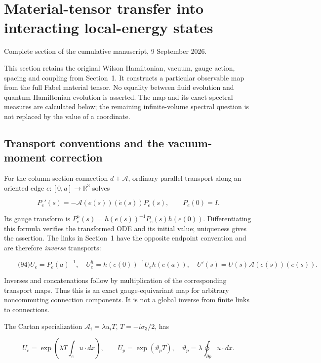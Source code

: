 \section{Material-tensor transfer into interacting local-energy
states}\label{fabel-tensor-transfer-md-material-tensor-transfer-into-interacting-local-energy-states}

Complete section of the cumulative manuscript, 9 September 2026.

This section retains the original Wilson Hamiltonian, vacuum, gauge
action, spacing and coupling from Section~1. It constructs a particular
observable map from the full Fabel material tensor. No equality between
fluid evolution and quantum Hamiltonian evolution is asserted. The map
and its exact spectral measures are calculated below; the remaining
infinite-volume spectral question is not replaced by the value of a
coordinate.

\subsection{Transport conventions and the vacuum-moment
correction}\label{fabel-tensor-transfer-md-transport-conventions-and-the-vacuum-moment-correction}

For the column-section connection \(d+\mathcal A\), ordinary parallel
transport along an oriented edge \(e:[0,a]\to\mathbb R^3\) solves

\[
P_e'(s)=-\mathcal A(e(s))(\dot e(s))P_e(s),\qquad P_e(0)=I.
\]

Its gauge transform is \(P_e^h(s)=h(e(s))^{-1}P_e(s)h(e(0))\).
Differentiating this formula verifies the transformed ODE and its
initial value; uniqueness gives the assertion. The links in Section~1
have the opposite endpoint convention and are therefore \emph{inverse}
transports:

\[
\qquad\text{(94)}
 U_e=P_e(a)^{-1},\quad
 U_e^h=h(e(0))^{-1}U_eh(e(a)),\quad U'(s)=U(s)\mathcal A(e(s))(\dot e(s)).
\]

Inverses and concatenations follow by multiplication of the
corresponding transport maps. Thus this is an exact gauge-equivariant
map for arbitrary noncommuting connection components. It is not a global
inverse from finite links to connections.

The Cartan specialization \(\mathcal A_i=\lambda u_iT\),
\(T=-i\sigma_3/2\), has

\[
U_e=\exp\left(\lambda T\int_e u\cdot dx\right),\qquad
 U_p=\exp(\vartheta_pT),\quad
 \vartheta_p=\lambda\oint_{\partial p}u\cdot dx .
\]

